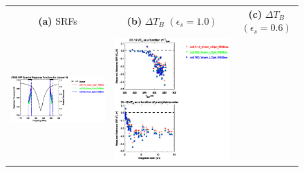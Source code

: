 \begin{figure}[H]
  \centering
  \begin{tabular}{c c c}
    \textsf{\textbf{(a)} SRFs} &
    \textsf{\textbf{(b)} $\Delta T_B$ $(\epsilon_s = 1.0)$} &
    \textsf{\textbf{(c)} $\Delta T_B$ $(\epsilon_s = 0.6)$} \\
    \includegraphics[bb=80 400 280 558,clip,scale=0.85]{graphics/srf/Tset/atms_npp.ch18.osrf.eps} &
    \includegraphics[bb=85 400 260 558,clip,scale=0.85]{graphics/dtb/Tset/e1.0_r0.0/atms_npp.ch18.dTb.eps} & 

\end{tabular}
\end{figure}
